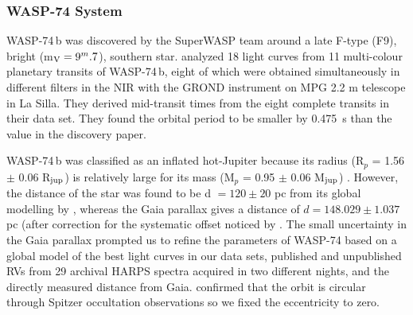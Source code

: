 \documentclass[a4paper,fleqn,usenatbib]{mnras}
\begin{document}
\subsubsection{WASP-74 System}
\label{sec:ttv_WASP74}
WASP-74\,b was discovered by the SuperWASP team \citep{2015AJ....150...18H} around a late F-type (F9), bright (m$_{\rm V} = 9^m.7$), southern star. \cite{2019MNRAS.485.5168M} analyzed 18 light curves from 11 multi-colour planetary transits of WASP-74\,b, eight of which were obtained simultaneously in different filters in the NIR with the GROND instrument on MPG 2.2 m telescope in La Silla. They derived mid-transit times from the eight complete transits in their data set. They found the orbital period to be smaller by 0.475~s than the value in the discovery paper.

WASP-74\,b was classified as an inflated hot-Jupiter because its radius (R$_p$ = 1.56 $\pm$ 0.06 R$_{\rm jup}$) is relatively large for its mass (M$_p$ = 0.95 $\pm$ 0.06 M$_{\rm jup}$) \citep{2015AJ....150...18H}. However, the distance of the star was found to be d $= 120 \pm 20$ pc from its global modelling by \cite{2015AJ....150...18H}, whereas the Gaia parallax \citep{2016A&A...595A...1G, 2018A&A...616A...1G} gives a distance of $d = 148.029 \pm 1.037$ pc (after correction for the systematic offset noticed by \citet{2018ApJ...862...61S}. The small uncertainty in the Gaia parallax prompted us to refine the parameters of WASP-74 based on a global model of the best light curves in our data sets,  published and unpublished RVs from 29 archival HARPS spectra acquired in two different nights, and the directly measured distance from Gaia. \citet{2020AJ....159..137G} confirmed that the orbit is circular through Spitzer occultation observations so we fixed the eccentricity to zero.
\end{document}
